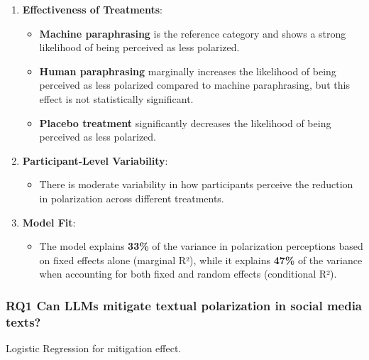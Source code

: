 \documentclass[
]{article}
\providecommand{\tightlist}{%
  \setlength{\itemsep}{0pt}\setlength{\parskip}{0pt}}
\begin{document}
\begin{enumerate}
\def\labelenumi{\arabic{enumi}.}
\tightlist
\item
  \textbf{Effectiveness of Treatments}:

  \begin{itemize}
  \tightlist
  \item
    \textbf{Machine paraphrasing} is the reference category and shows a
    strong likelihood of being perceived as less polarized.
  \item
    \textbf{Human paraphrasing} marginally increases the likelihood of
    being perceived as less polarized compared to machine paraphrasing,
    but this effect is not statistically significant.
  \item
    \textbf{Placebo treatment} significantly decreases the likelihood of
    being perceived as less polarized.
  \end{itemize}
\item
  \textbf{Participant-Level Variability}:

  \begin{itemize}
  \tightlist
  \item
    There is moderate variability in how participants perceive the
    reduction in polarization across different treatments.
  \end{itemize}
\item
  \textbf{Model Fit}:

  \begin{itemize}
  \tightlist
  \item
    The model explains \textbf{33\%} of the variance in polarization
    perceptions based on fixed effects alone (marginal R²), while it
    explains \textbf{47\%} of the variance when accounting for both
    fixed and random effects (conditional R²).
  \end{itemize}
\end{enumerate}

\subsubsection{\texorpdfstring{\textbf{RQ1} Can LLMs mitigate textual
polarization in social media
texts?}{RQ1 Can LLMs mitigate textual polarization in social media texts?}}\label{rq1-can-llms-mitigate-textual-polarization-in-social-media-texts}

Logistic Regression for mitigation effect.
\end{document}
